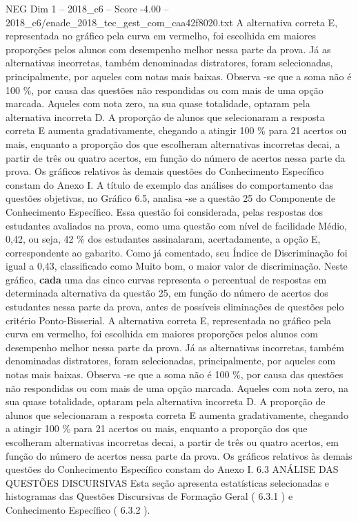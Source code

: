 \begin{textsample}{NEG Dim 1 – 2018\_c6 – Score -4.00 – 2018\_c6/enade\_2018\_tec\_gest\_com\_caa42f8020.txt}
A alternativa correta E, representada no gráfico pela curva em vermelho, foi escolhida em maiores proporções pelos alunos com desempenho melhor nessa parte da prova.
Já as alternativas incorretas, também denominadas distratores, foram selecionadas, principalmente, por aqueles com notas mais baixas.
Observa -se que a soma não é 100 \%, por causa das questões não respondidas ou com mais de uma opção marcada.
Aqueles com nota zero, na sua quase totalidade, optaram pela alternativa incorreta D.
A proporção de alunos que selecionaram a resposta correta E aumenta gradativamente, chegando a atingir 100 \% para 21 acertos ou mais, enquanto a proporção dos que escolheram alternativas incorretas decai, a partir de três ou quatro acertos, em função do número de acertos nessa parte da prova.
Os gráficos relativos às demais questões do Conhecimento Específico constam do Anexo I.
A título de exemplo das análises do comportamento das questões objetivas, no Gráfico 6.5, analisa -se a questão 25 do Componente de Conhecimento Específico.
Essa questão foi considerada, pelas respostas dos estudantes avaliados na prova, como uma questão com nível de facilidade Médio, 0,42, ou seja, 42 \% dos estudantes assinalaram, acertadamente, a opção E, correspondente ao gabarito.
Como já comentado, seu Índice de Discriminação foi igual a 0,43, classificado como Muito bom, o maior valor de discriminação.
Neste gráfico, \textbf{cada} uma das cinco curvas representa o percentual de respostas em determinada alternativa da questão 25, em função do número de acertos dos estudantes nessa parte da prova, antes de possíveis eliminações de questões pelo critério Ponto-Bisserial.
A alternativa correta E, representada no gráfico pela curva em vermelho, foi escolhida em maiores proporções pelos alunos com desempenho melhor nessa parte da prova.
Já as alternativas incorretas, também denominadas distratores, foram selecionadas, principalmente, por aqueles com notas mais baixas.
Observa -se que a soma não é 100 \%, por causa das questões não respondidas ou com mais de uma opção marcada.
Aqueles com nota zero, na sua quase totalidade, optaram pela alternativa incorreta D.
A proporção de alunos que selecionaram a resposta correta E aumenta gradativamente, chegando a atingir 100 \% para 21 acertos ou mais, enquanto a proporção dos que escolheram alternativas incorretas decai, a partir de três ou quatro acertos, em função do número de acertos nessa parte da prova.
Os gráficos relativos às demais questões do Conhecimento Específico constam do Anexo I. 6.3 ANÁLISE DAS QUESTÕES DISCURSIVAS Esta seção apresenta estatísticas selecionadas e histogramas das Questões Discursivas de Formação Geral ( 6.3.1 ) e Conhecimento Específico ( 6.3.2 ).

\end{textsample}
